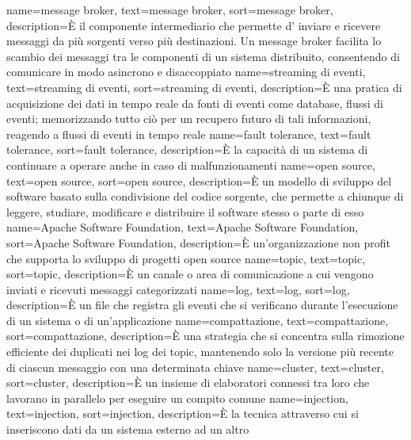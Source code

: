{
    name={message broker},
    text=message broker,
    sort=message broker,
    description={È il componente intermediario che permette d' inviare e ricevere messaggi da più sorgenti verso più destinazioni. Un message broker facilita lo scambio dei messaggi 
    tra le componenti di un sistema distribuito, consentendo di comunicare in modo asincrono e disaccoppiato}
}
{
    name={streaming di eventi},
    text=streaming di eventi,
    sort=streaming di eventi,
    description={È una pratica di acquisizione dei dati in tempo reale da fonti di eventi come database, flussi
    di eventi; memorizzando tutto ciò per un recupero futuro di tali informazioni, reagendo a
    flussi di eventi in tempo reale}
}
{
    name={fault tolerance},
    text=fault tolerance,
    sort=fault tolerance,
    description={È la capacità di un sistema di continuare a operare anche in caso di malfunzionamenti}
}
{
    name={open source},
    text=open source,
    sort=open source,
    description={È un modello di sviluppo del software basato sulla condivisione del codice sorgente, che permette a chiunque di leggere, studiare, modificare e distribuire il software stesso o parte di esso}
}
{
    name={Apache Software Foundation},
    text=Apache Software Foundation,
    sort=Apache Software Foundation,
    description={È un'organizzazione non profit che supporta lo sviluppo di progetti open source}
}
{
    name={topic},
    text=topic,
    sort=topic,
    description={È un canale o area di comunicazione a cui vengono inviati e ricevuti messaggi categorizzati}
}
{
    name={log},
    text=log,
    sort=log,
    description={È un file che registra gli eventi che si verificano durante l'esecuzione di un sistema o di un'applicazione}
}
{
    name={compattazione},
    text=compattazione,
    sort=compattazione,
    description={È una strategia che si concentra sulla rimozione efficiente dei duplicati nei log dei topic, mantenendo solo la versione più recente di ciascun messaggio con una determinata chiave}
}
{
    name={cluster},
    text=cluster,
    sort=cluster,
    description={È un insieme di elaboratori connessi tra loro che lavorano in parallelo per eseguire un compito comune}
}
{
    name={injection},
    text=injection,
    sort=injection,
    description={È la tecnica attraverso cui si inseriscono dati da un sistema esterno ad un altro}
}

